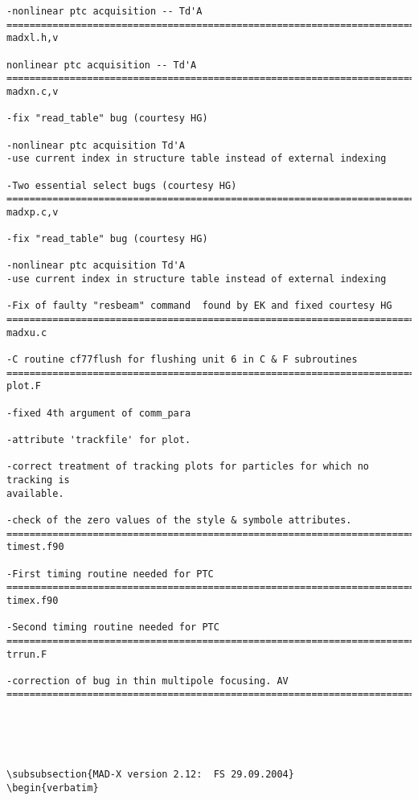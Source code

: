 \begin{verbatim}
-nonlinear ptc acquisition -- Td'A
=============================================================================
madxl.h,v

nonlinear ptc acquisition -- Td'A
=============================================================================
madxn.c,v

-fix "read_table" bug (courtesy HG)

-nonlinear ptc acquisition Td'A
-use current index in structure table instead of external indexing

-Two essential select bugs (courtesy HG)
=============================================================================
madxp.c,v

-fix "read_table" bug (courtesy HG)

-nonlinear ptc acquisition Td'A
-use current index in structure table instead of external indexing

-Fix of faulty "resbeam" command  found by EK and fixed courtesy HG
=============================================================================
madxu.c

-C routine cf77flush for flushing unit 6 in C & F subroutines
=============================================================================
plot.F

-fixed 4th argument of comm_para

-attribute 'trackfile' for plot.

-correct treatment of tracking plots for particles for which no tracking is
available.

-check of the zero values of the style & symbole attributes.
=============================================================================
timest.f90

-First timing routine needed for PTC
=============================================================================
timex.f90

-Second timing routine needed for PTC
=============================================================================
trrun.F

-correction of bug in thin multipole focusing. AV
=============================================================================





\subsubsection{MAD-X version 2.12:  FS 29.09.2004}
\begin{verbatim}



\end{verbatim}
